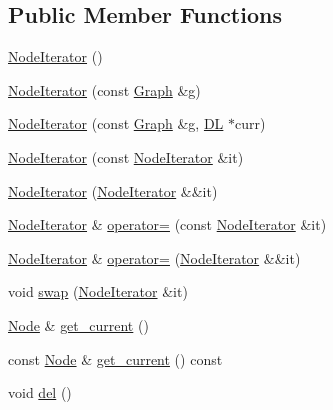 \subsection*{Public Member Functions}
\begin{DoxyCompactItemize}
\item 
\hyperlink{class_designar_1_1_graph_1_1_node_iterator_a0449a6ba6cd5d43c04567210a8a064b1}{Node\+Iterator} ()
\item 
\hyperlink{class_designar_1_1_graph_1_1_node_iterator_a646f28f9dbd99df7317dd0cf22122f42}{Node\+Iterator} (const \hyperlink{class_designar_1_1_graph}{Graph} \&g)
\item 
\hyperlink{class_designar_1_1_graph_1_1_node_iterator_abc568563840c41429af62d925d45afc6}{Node\+Iterator} (const \hyperlink{class_designar_1_1_graph}{Graph} \&g, \hyperlink{class_designar_1_1_d_l}{DL} $\ast$curr)
\item 
\hyperlink{class_designar_1_1_graph_1_1_node_iterator_a40d0aa3fa7ccc2036d94244fe6a49636}{Node\+Iterator} (const \hyperlink{class_designar_1_1_graph_1_1_node_iterator}{Node\+Iterator} \&it)
\item 
\hyperlink{class_designar_1_1_graph_1_1_node_iterator_ada36544eee3fdca80d6bee17a48a1638}{Node\+Iterator} (\hyperlink{class_designar_1_1_graph_1_1_node_iterator}{Node\+Iterator} \&\&it)
\item 
\hyperlink{class_designar_1_1_graph_1_1_node_iterator}{Node\+Iterator} \& \hyperlink{class_designar_1_1_graph_1_1_node_iterator_a719ff82b05657c0a0667f4f953ec669d}{operator=} (const \hyperlink{class_designar_1_1_graph_1_1_node_iterator}{Node\+Iterator} \&it)
\item 
\hyperlink{class_designar_1_1_graph_1_1_node_iterator}{Node\+Iterator} \& \hyperlink{class_designar_1_1_graph_1_1_node_iterator_aa2dc7e1b1ae8e683ae56aa8c236a3187}{operator=} (\hyperlink{class_designar_1_1_graph_1_1_node_iterator}{Node\+Iterator} \&\&it)
\item 
void \hyperlink{class_designar_1_1_graph_1_1_node_iterator_a041e58acb80dabbb11bbc54dfc141db6}{swap} (\hyperlink{class_designar_1_1_graph_1_1_node_iterator}{Node\+Iterator} \&it)
\item 
\hyperlink{class_designar_1_1_graph_a5dfc7dba9d092ac489c72e40390c37d0}{Node} \& \hyperlink{class_designar_1_1_graph_1_1_node_iterator_a79268477058bf2d213dc11581c12a125}{get\+\_\+current} ()
\item 
const \hyperlink{class_designar_1_1_graph_a5dfc7dba9d092ac489c72e40390c37d0}{Node} \& \hyperlink{class_designar_1_1_graph_1_1_node_iterator_ad616e03e33435abfe6034a76ea5e2ecf}{get\+\_\+current} () const
\item 
void \hyperlink{class_designar_1_1_graph_1_1_node_iterator_a8ff7d2de6b10d3fd60774db675340259}{del} ()
\end{DoxyCompactItemize}
